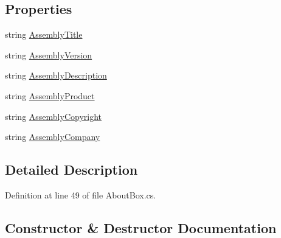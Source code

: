 \subsection*{Properties}
\begin{DoxyCompactItemize}
\item 
string \hyperlink{class_m_p_f_s21_1_1_about_box_af2a79cddc6558ffaf27887aea18b9284}{Assembly\+Title}
\item 
string \hyperlink{class_m_p_f_s21_1_1_about_box_acd68f60edf56b113543777b903eaeb65}{Assembly\+Version}
\item 
string \hyperlink{class_m_p_f_s21_1_1_about_box_ae86b359b03b428a1d52a243c97010f99}{Assembly\+Description}
\item 
string \hyperlink{class_m_p_f_s21_1_1_about_box_abefc20842c8b4853c417cf1865ed7b1e}{Assembly\+Product}
\item 
string \hyperlink{class_m_p_f_s21_1_1_about_box_a54161c99367e733eb93d27a46d1b1a50}{Assembly\+Copyright}
\item 
string \hyperlink{class_m_p_f_s21_1_1_about_box_a0653ce242a69507159289723e7edf77a}{Assembly\+Company}
\end{DoxyCompactItemize}


\subsection{Detailed Description}


Definition at line 49 of file About\+Box.\+cs.



\subsection{Constructor \& Destructor Documentation}
\hypertarget{class_m_p_f_s21_1_1_about_box_a3f44dc7ff8daea4c093b5ba3ad7097a5}{}
